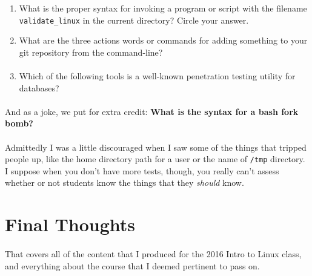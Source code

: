 \documentclass[11pt]{article}
\begin{document}
\begin{enumerate}
		\item  What is the proper syntax for invoking a program or script with the filename \texttt{validate\_linux} in the current directory? Circle your answer. \\

		\item  What are the three actions words or commands for adding something to your git repository from the command-line? 
		\paragraph{}

		\item  Which of the following tools is a well-known penetration testing utility for databases?

	\end{enumerate}

	\paragraph{} And as a joke, we put for extra credit: \textbf{What is the syntax for a bash fork bomb?}

	\paragraph{} Admittedly I was a little discouraged when I saw some of the things that tripped people up, like the home directory path for a user or the name of \texttt{/tmp} directory. I suppose when you don't have more tests, though, you really can't assess whether or not students know the things that they \textit{should} know.

	\newpage

\section{Final Thoughts}

	\paragraph{} That covers all of the content that I produced for the 2016 Intro to Linux class, and everything about the course that I deemed pertinent to pass on.
\end{document}
